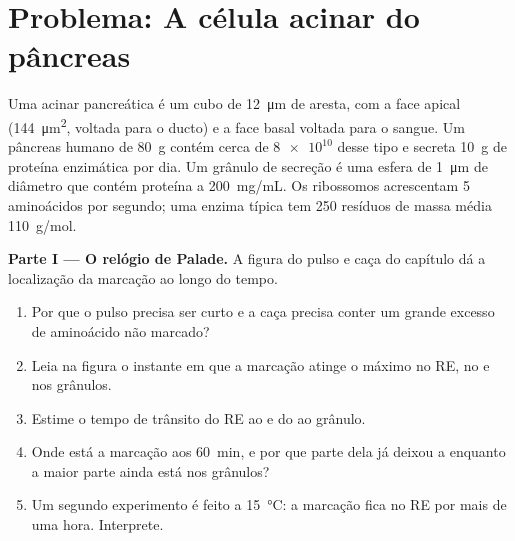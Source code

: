 \section{Problema: A célula acinar do pâncreas}

\begin{problem}
\label{pb:b1:eukaryotic-cell:1}
Uma  acinar pancreática é um cubo de \qty{12}{\micro m} de aresta,
com a face apical (\qty{144}{\micro m^2}, voltada para o ducto) e a face
basal voltada para o sangue. Um pâncreas humano de \qty{80}{g} contém
cerca de $\num{8e10}$  desse tipo e secreta \qty{10}{g} de
proteína enzimática por dia. Um grânulo de secreção é uma esfera de
\qty{1}{\micro m} de diâmetro que contém proteína a \qty{200}{mg/mL}. Os
ribossomos acrescentam \qty{5}{} aminoácidos por segundo; uma enzima
típica tem \qty{250}{} resíduos de massa média \qty{110}{g/mol}.

\medskip
\noindent\textbf{Parte I --- O relógio de Palade.}
A figura do pulso e caça do capítulo dá a localização da marcação ao
longo do tempo.
\begin{enumerate}
  \item Por que o pulso precisa ser curto e a caça precisa conter um
        grande excesso de aminoácido não marcado?
  \item Leia na figura o instante em que a marcação atinge o máximo no
        RE, no  e nos grânulos.
  \item Estime o tempo de trânsito do RE ao  e do  ao grânulo.
  \item Onde está a marcação aos \qty{60}{min}, e por que parte dela já
        deixou a  enquanto a maior parte ainda está nos grânulos?
  \item Um segundo experimento é feito a \qty{15}{\celsius}: a marcação
        fica no RE por mais de uma hora. Interprete.
\end{enumerate}


\end{problem}
